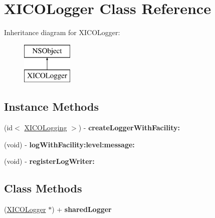 \hypertarget{interface_x_i_c_o_logger}{}\section{X\+I\+C\+O\+Logger Class Reference}
\label{interface_x_i_c_o_logger}
Inheritance diagram for X\+I\+C\+O\+Logger\+:\begin{figure}[H]
\begin{center}
\leavevmode
\includegraphics[height=2.000000cm]{interface_x_i_c_o_logger}
\end{center}
\end{figure}
\subsection*{Instance Methods}
\begin{DoxyCompactItemize}
\item 
\hypertarget{interface_x_i_c_o_logger_af62f1fd9977561ffb9e8dfe1b4dc734c}{}\label{interface_x_i_c_o_logger_af62f1fd9977561ffb9e8dfe1b4dc734c} 
(id$<$ \hyperlink{protocol_x_i_c_o_logging-p}{X\+I\+C\+O\+Logging} $>$) -\/ {\bfseries create\+Logger\+With\+Facility\+:}
\item 
\hypertarget{interface_x_i_c_o_logger_a327c3f7d83fdf1e62208dbae6dd8f627}{}\label{interface_x_i_c_o_logger_a327c3f7d83fdf1e62208dbae6dd8f627} 
(void) -\/ {\bfseries log\+With\+Facility\+:level\+:message\+:}
\item 
\hypertarget{interface_x_i_c_o_logger_adbbb4099f88f07d4b691b3f86b606069}{}\label{interface_x_i_c_o_logger_adbbb4099f88f07d4b691b3f86b606069} 
(void) -\/ {\bfseries register\+Log\+Writer\+:}
\end{DoxyCompactItemize}
\subsection*{Class Methods}
\begin{DoxyCompactItemize}
\item 
\hypertarget{interface_x_i_c_o_logger_a3dec1d00450f733eef2f99cc3b74dc00}{}\label{interface_x_i_c_o_logger_a3dec1d00450f733eef2f99cc3b74dc00} 
(\hyperlink{interface_x_i_c_o_logger}{X\+I\+C\+O\+Logger} $\ast$) + {\bfseries shared\+Logger}
\end{DoxyCompactItemize}
